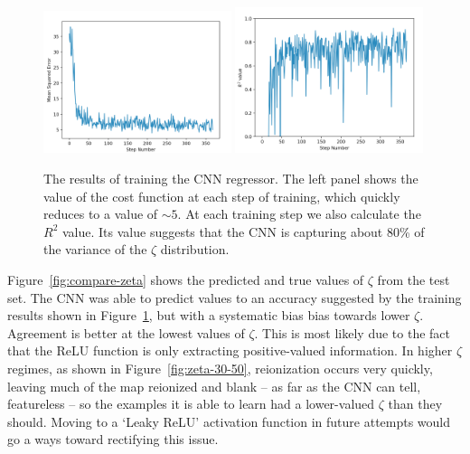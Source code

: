 \begin{figure}
\centering
\includegraphics[width=0.49\textwidth]{chapters/hera_ml/figures/zeta-MSE.png}
\includegraphics[width=0.49\textwidth]{chapters/hera_ml/figures/zeta-R2.png}
\caption[The results of training the CNN regressor.]{The results of training the CNN regressor. The left panel shows the value of the cost function at each step of training, which quickly reduces to a value of $\sim 5$. At each training step we also calculate the $R^2$ value. Its value suggests that the CNN is capturing about 80\% of the variance of the $\zeta$ distribution.}
\label{fig:CNN_training_results}
\end{figure}

Figure~\ref{fig:compare-zeta} shows the predicted and true values of $\zeta$ from the test set. The CNN was able to predict values to an accuracy suggested by the training results shown in Figure~\ref{fig:CNN_training_results}, but with a systematic bias bias towards lower $\zeta$. Agreement is better at the lowest values of $\zeta$. This is most likely due to the fact that the ReLU function is only extracting positive-valued information. In higher $\zeta$ regimes, as shown in Figure~\ref{fig:zeta-30-50}, reionization occurs very quickly, leaving much of the map reionized and blank -- as far as the CNN can tell, featureless -- so the examples it is able to learn had a lower-valued $\zeta$ than they should. Moving to a `Leaky ReLU' activation function in future attempts would go a ways toward rectifying this issue.

